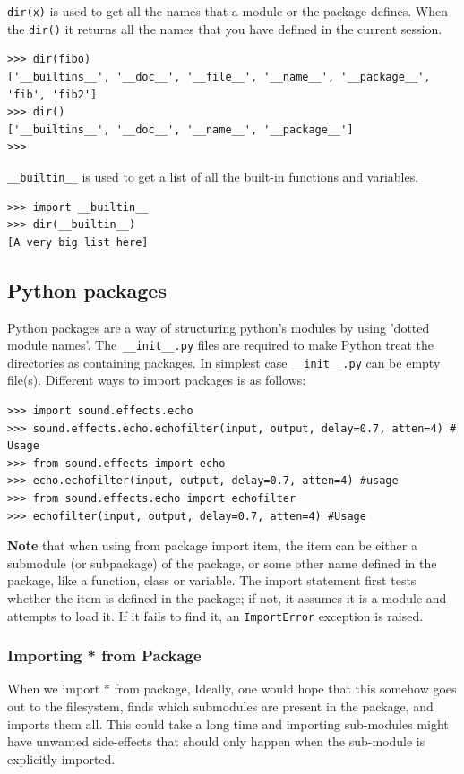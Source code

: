 \documentclass[12pt,a4paper]{article}
\begin{document}
\texttt{dir(x)} is used to get all the names that a module or the package defines. When the \texttt{dir()} it returns all the names that you have defined in the current session.
\begin{verbatim}
>>> dir(fibo)
['__builtins__', '__doc__', '__file__', '__name__', '__package__', 'fib', 'fib2']
>>> dir()
['__builtins__', '__doc__', '__name__', '__package__']
>>> 
\end{verbatim}

\texttt{\_\_builtin\_\_} is used to get a list of all the built-in functions and variables.
\begin{verbatim}
>>> import __builtin__
>>> dir(__builtin__)
[A very big list here]
\end{verbatim}
\subsection{Python packages}
Python packages are a way of structuring python's modules by using 'dotted module names'. The\texttt{ \_\_init\_\_.py} files are required to make Python treat the directories as containing packages. In simplest case \texttt{\_\_init\_\_.py} can be empty file(s). Different ways to import packages is as follows:
\begin{verbatim}
>>> import sound.effects.echo
>>> sound.effects.echo.echofilter(input, output, delay=0.7, atten=4) # Usage
>>> from sound.effects import echo
>>> echo.echofilter(input, output, delay=0.7, atten=4) #usage
>>> from sound.effects.echo import echofilter
>>> echofilter(input, output, delay=0.7, atten=4) #Usage
\end{verbatim}
\textbf{Note} that when using from package import item, the item can be either a submodule (or subpackage) of the package, or some other name defined in the package, like a function, class or variable. The import statement first tests whether the item is defined in the package; if not, it assumes it is a module and attempts to load it. If it fails to find it, an \texttt{ImportError} exception is raised.

\subsubsection{Importing * from Package}
When we import * from package, Ideally, one would hope that this somehow goes out to the filesystem, finds which submodules are present in the package, and imports them all. This could take a long time and importing sub-modules might have unwanted side-effects that should only happen when the sub-module is explicitly imported.
\end{document}
